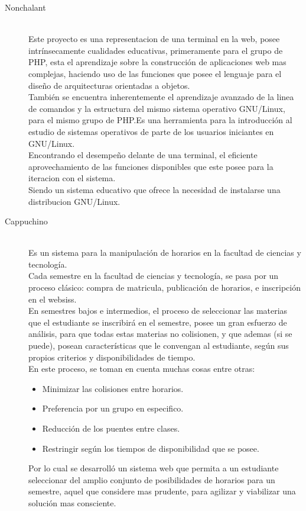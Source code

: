\documentclass[11pt,letterpaper]{article}
\begin{document}
\begin{description}
	\item[Nonchalant]~\\
		Este proyecto es una representacion de una terminal en la web, posee intrínsecamente cualidades educativas, primeramente para el grupo de PHP, esta el aprendizaje sobre la construcción de aplicaciones web mas complejas, haciendo uso de las funciones que posee el lenguaje para el diseño de arquitecturas orientadas a objetos.\\
		También se encuentra inherentemente el aprendizaje avanzado de la linea de comandos y la estructura del mismo sistema operativo GNU/Linux, para el mismo grupo de PHP.Es una herramienta para la introducción al estudio de sistemas operativos de parte de los usuarios iniciantes en GNU/Linux.\\
		Encontrando el desempeño delante de una terminal, el eficiente aprovechamiento de las funciones disponibles que este posee para la iteracion con el sistema.\\
		Siendo un sistema educativo que ofrece la necesidad de instalarse una distribucion GNU/Linux. 
	\item[Cappuchino]~\\
		Es un sistema para la manipulación de horarios en la facultad de ciencias y tecnología.\\
		Cada semestre en la facultad de ciencias y tecnología, se pasa por un proceso clásico: compra de matricula, publicación de horarios, e inscripción en el websiss.\\
		En semestres bajos e intermedios, el proceso de seleccionar las materias que el estudiante se inscribirá en el semestre, posee un gran esfuerzo de análisis, para que todas estas materias no colisionen, y que ademas (si se puede), posean características que le convengan al estudiante, según sus propios criterios y disponibilidades de tiempo.\\
		En este proceso, se toman en cuenta muchas cosas entre otras:
		\begin{itemize}
			\item Minimizar las colisiones entre horarios.
			\item Preferencia por un grupo en especifico.
			\item Reducción de los puentes entre clases.
			\item Restringir según los tiempos de disponibilidad que se posee.
		\end{itemize}
		Por lo cual se desarrolló un sistema web que permita a un estudiante seleccionar del amplio conjunto de posibilidades de horarios para un semestre, aquel que considere mas prudente, para agilizar y viabilizar una solución mas consciente.

\end{description}
\end{document}

